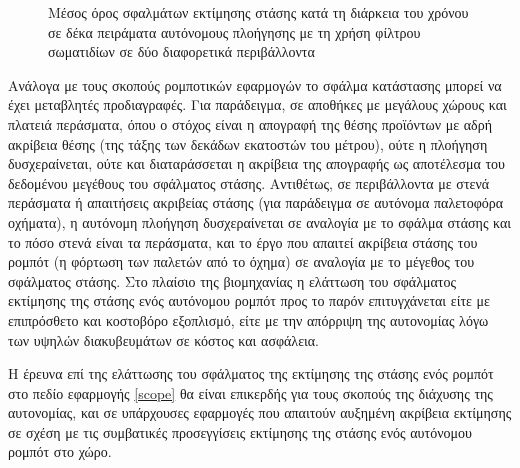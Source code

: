 \begin{figure}[h]\centering\vspace{2.5cm}
   \begin{subfigure}{0.49\linewidth}\centering
     
   \end{subfigure}
   \begin{subfigure}{0.49\linewidth} \centering
     
   \end{subfigure}
   \vspace{0.75cm}
\caption{\small Μέσος όρος σφαλμάτων εκτίμησης στάσης κατά τη διάρκεια του
         χρόνου σε δέκα πειράματα αυτόνομους πλοήγησης με τη χρήση φίλτρου
         σωματιδίων σε δύο διαφορετικά περιβάλλοντα}
\label{fig:02_01_05}
\end{figure}

Ανάλογα με τους σκοπούς ρομποτικών εφαρμογών το σφάλμα κατάστασης μπορεί να
έχει μεταβλητές προδιαγραφές. Για παράδειγμα, σε αποθήκες με μεγάλους χώρους και
πλατειά περάσματα, όπου ο στόχος είναι η απογραφή της θέσης προϊόντων με αδρή
ακρίβεια θέσης (της τάξης των δεκάδων εκατοστών του μέτρου), ούτε η πλοήγηση
δυσχεραίνεται, ούτε και διαταράσσεται η ακρίβεια της απογραφής ως αποτέλεσμα
του δεδομένου μεγέθους του σφάλματος στάσης. Αντιθέτως, σε περιβάλλοντα με
στενά περάσματα ή απαιτήσεις ακριβείας στάσης (για παράδειγμα σε αυτόνομα
παλετοφόρα οχήματα), η αυτόνομη πλοήγηση δυσχεραίνεται σε αναλογία με το σφάλμα
στάσης και το πόσο στενά είναι τα περάσματα, και το έργο που απαιτεί ακρίβεια
στάσης του ρομπότ (η φόρτωση των παλετών από το όχημα) σε αναλογία με το
μέγεθος του σφάλματος στάσης. Στο πλαίσιο της βιομηχανίας η ελάττωση του
σφάλματος εκτίμησης της στάσης ενός αυτόνομου ρομπότ προς το παρόν
επιτυγχάνεται είτε με επιπρόσθετο και κοστοβόρο εξοπλισμό, είτε με την απόρριψη
της αυτονομίας λόγω των υψηλών διακυβευμάτων σε κόστος και ασφάλεια.

Η έρευνα επί της ελάττωσης του σφάλματος της εκτίμησης της στάσης ενός ρομπότ
στο πεδίο εφαρμογής \ref{scope} θα είναι επικερδής για τους σκοπούς της
διάχυσης της αυτονομίας, και σε υπάρχουσες εφαρμογές που απαιτούν αυξημένη
ακρίβεια εκτίμησης σε σχέση με τις συμβατικές προσεγγίσεις εκτίμησης της στάσης
ενός αυτόνομου ρομπότ στο χώρο.


